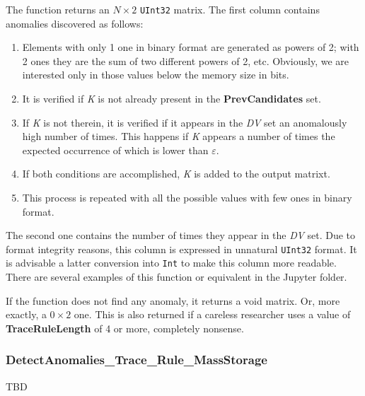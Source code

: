\begin{itemize}
\begin{itemize}
	 \end{itemize}
	 
	 The function returns an \(N\times 2\) \texttt{UInt32} matrix. The first column contains anomalies discovered as follows:
	 
	 \begin{enumerate}
	 	\item Elements with only 1 one in binary format are generated as powers of 2; with 2 ones they are the sum of two different powers of 2, etc. Obviously, we are interested only in those values below the memory size in bits.
	 	\item It is verified if \textit{K} is not already present in the \textbf{PrevCandidates} set.
	 	\item If \textit{K} is not therein, it is verified if it appears in the \textit{DV} set an anomalously high number of times. This happens if \textit{K} appears a number of times the expected occurrence of which is lower than \textbf{\(\varepsilon\)}.
	 	\item If both conditions are accomplished, \textit{K} is added to the output matrixt.
	 	\item This process is repeated with all the possible values with few ones in binary format.
	 \end{enumerate}
	 
	 The second one contains the number of times they appear in the \textit{DV} set. Due to format integrity reasons, this column is expressed in unnatural \texttt{UInt32} format. 	 
	 It is advisable a latter conversion into \texttt{Int} to make this column more readable. There are several examples of this function or equivalent in the Jupyter folder.
	 
	 If the function does not find any anomaly, it returns a void matrix.  Or, more exactly, a \(0\times 2\) one. This is also returned if a careless researcher uses a value of \textbf{TraceRuleLength} of 4 or more, completely nonsense.
	 
\end{itemize}
%
\subsubsection*{DetectAnomalies\_Trace\_Rule\_MassStorage}\label{Fun:DetectAnomaliesTraceRule_MassStorage}
%
TBD
%

